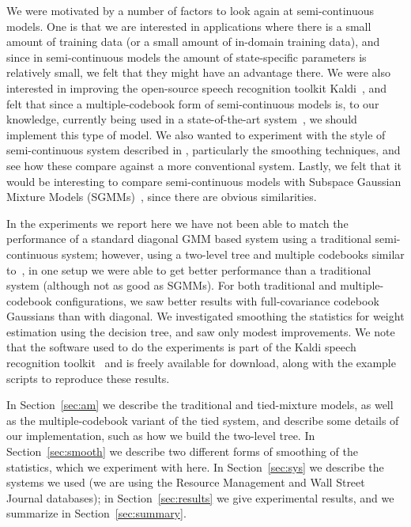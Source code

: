 \documentclass{article}
\begin{document}
We were motivated by a number of factors to look again at semi-continuous models.
One is that we are interested in applications where there is a small amount
of training data (or a small amount of in-domain training data), and since
in semi-continuous models the amount of state-specific parameters is relatively
small, we felt that they might have an advantage there.  We were also interested
in improving the open-source speech recognition toolkit {\sc Kaldi}~\cite{povey2011tks},
and felt that since a multiple-codebook form of semi-continuous models is, to
our knowledge, currently being used in a state-of-the-art system~\cite{prasad2004t2b},
we should implement this type of model.  We also wanted to experiment with
the style of semi-continuous system described 
in \cite{schukattalamazzini1994srf,schukattalamazzini1995as}, particularly the smoothing
techniques, and see how these compare against a more conventional system.
Lastly, we felt that it would be interesting to compare semi-continuous
models with Subspace Gaussian Mixture Models (SGMMs)~\cite{povey2011sgm}, since
there are obvious similarities.

In the experiments we report here we have not been able to match the performance of
a standard diagonal GMM based system using a traditional semi-continuous system;
however, using a two-level tree and multiple codebooks similar to~\cite{prasad2004t2b},
in one setup we were able to get better performance than a traditional system (although not
as good as SGMMs).  For both traditional and multiple-codebook configurations,
we saw better results with full-covariance codebook Gaussians than with diagonal.
We investigated smoothing the statistics for weight estimation using the decision
tree, and saw only modest improvements.
We note that the software used to do the experiments is part of the {\sc Kaldi} speech
recognition toolkit~\cite{povey2011tks} and is freely available for download, along with the
example scripts to reproduce these results.

In Section~\ref{sec:am} we describe the traditional and tied-mixture models,
as well as the multiple-codebook variant of the tied system, and describe some
details of our implementation, such as how we build the two-level tree.
In Section~\ref{sec:smooth} we describe two different forms of smoothing of the statistics,
which we experiment with here.  
In Section~\ref{sec:sys} we describe the systems we used (we are using
the Resource Management and Wall Street Journal databases);
in Section~\ref{sec:results} we give experimental results, and we
summarize in Section~\ref{sec:summary}.
\end{document}
